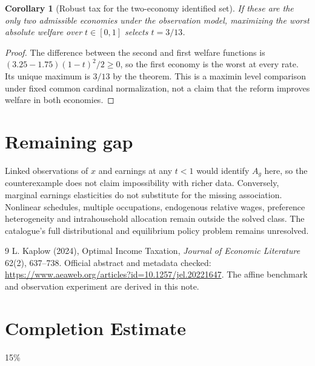 \documentclass[11pt]{article}
\newtheorem{corollary}{Corollary}
\theoremstyle{definition}
\begin{document}
\begin{corollary}[Robust tax for the two-economy identified set]
If these are the only two admissible economies under the observation model, maximizing the worst absolute welfare over $t\in[0,1]$ selects $t=3/13$.
\end{corollary}
\begin{proof}
The difference between the second and first welfare functions is $(3.25-1.75)(1-t)^2/2\geq0$, so the first economy is the worst at every rate. Its unique maximum is $3/13$ by the theorem. This is a maximin level comparison under fixed common cardinal normalization, not a claim that the reform improves welfare in both economies.
\end{proof}

\section*{Remaining gap}
Linked observations of $x$ and earnings at any $t<1$ would identify $A_g$ here, so the counterexample does not claim impossibility with richer data. Conversely, marginal earnings elasticities do not substitute for the missing association. Nonlinear schedules, multiple occupations, endogenous relative wages, preference heterogeneity and intrahousehold allocation remain outside the solved class. The catalogue's full distributional and equilibrium policy problem remains unresolved.
\begin{thebibliography}{9}
 L. Kaplow (2024), Optimal Income Taxation, \emph{Journal of Economic Literature} 62(2), 637--738. Official abstract and metadata checked: \url{https://www.aeaweb.org/articles?id=10.1257/jel.20221647}. The affine benchmark and observation experiment are derived in this note.
\end{thebibliography}

\section{Completion Estimate}
15\%
\end{document}
